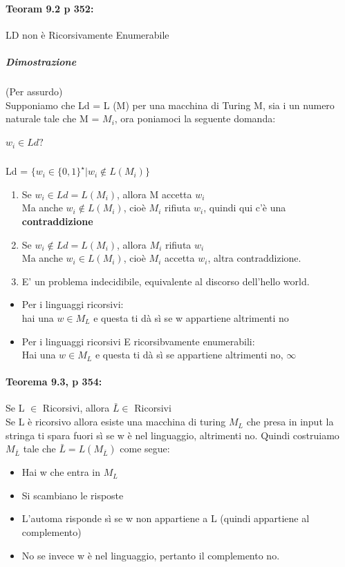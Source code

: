 \documentclass[12pt, a4paper, openany, oneside]{book}
\begin{document}
\paragraph{Teoram 9.2 p 352: }LD non è Ricorsivamente Enumerabile
\subparagraph{Dimostrazione} (Per assurdo) \\
Supponiamo che Ld = L (M) per una macchina di Turing M, sia i un numero naturale
tale che M = $M_{i}$, ora poniamoci la seguente domanda: 
\subparagraph{$w_{i} \in Ld?$} Ld = $\{w_{i} \in \{0,1\}^{\star} | w_{i} \notin L(M_{i})\}$	
\begin{enumerate}
	\item Se $w_{i} \in Ld = L(M_{i})$, allora M accetta $w_{i}$\\
	Ma anche $w_{i} \notin L(M_{i})$, cioè $M_{i}$ rifiuta $w_{i}$, quindi qui c'è 
	una \textbf{contraddizione}
	\item Se $w_{i} \notin Ld = L(M_{i})$, allora $M_{i}$ rifiuta $w_{i}$\\
	Ma anche $w_{i} \in L(M_{i})$, cioè $M_{i}$ accetta $w_{i}$, altra contraddizione.
	\item E' un problema indecidibile, equivalente al discorso dell'hello world.
\end{enumerate}
\begin{itemize}
	\item Per i linguaggi ricorsivi:\\
	hai una $w \in M_{L}$ e questa ti dà sì se w appartiene altrimenti no
	\item Per i linguaggi ricorsivi E ricorsibvamente enumerabili:\\
	Hai una $w \in M_{L}$ e questa ti dà sì se appartiene altrimenti no, $\infty$
\end{itemize}
\paragraph{Teorema 9.3, p 354: }Se L $\in$ Ricorsivi, allora $\bar{L} \in$ Ricorsivi\\
Se L è ricorsivo allora esiste una macchina di turing $M_{L}$ che presa in input
la stringa ti spara fuori sì se w è nel linguaggio, altrimenti no.
Quindi costruiamo $M_{\bar{L}}$ tale che $\bar{L} = L(M_{\bar{L}})$ come segue:
\begin{itemize}
	\item Hai w che entra in $M_{L}$
	\item Si scambiano le risposte
	\item L'automa risponde sì se w non appartiene a L (quindi appartiene al 
	complemento)
	\item No se invece w è nel linguaggio, pertanto il complemento no.
\end{itemize}
\end{document}

